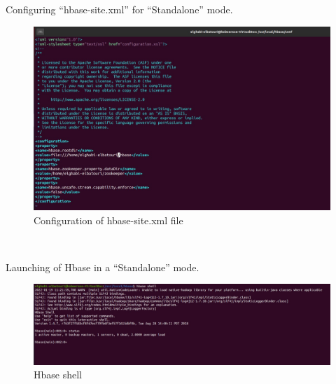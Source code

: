 \begin{spacing}{1.2}
\par Configuring “hbase-site.xml” for “Standalone” mode.
\\
\begin{figure}[!htb] 
\begin{center} 
\includegraphics[width=1\linewidth]{Pictures/HBase/Configuring Hbase in Standalone & Pseudo-distributed mode/Configuring Hbase in Standalone mode/Configuration of hbase-site.xml file .jpg} 
\end{center} 
\caption{Configuration of hbase-site.xml file} 
\end{figure}  \FloatBarrier
\\

\par Launching of Hbase in a “Standalone” mode.
\\
\begin{figure}[!htb] 
\begin{center} 
\includegraphics[width=1\linewidth]{Pictures/HBase/Configuring Hbase in Standalone & Pseudo-distributed mode/Configuring Hbase in Standalone mode/Hbase shell} 
\end{center} 
\caption{Hbase shell} 
\end{figure}  \FloatBarrier
\\


\end{spacing}
